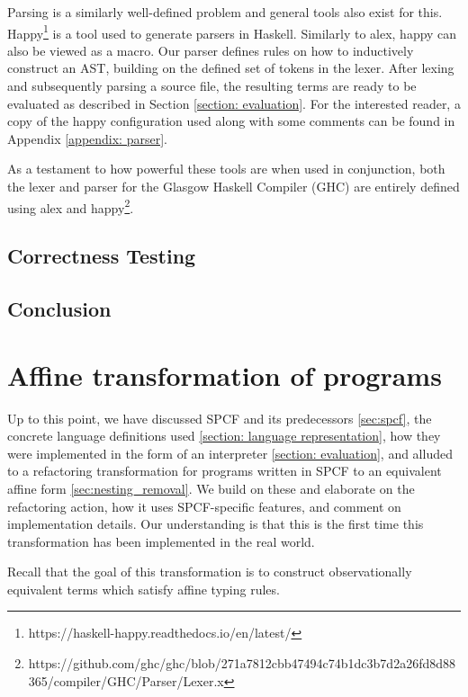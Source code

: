 \documentclass[12pt,a4paper]{report}
\theoremstyle{definition}
\theoremstyle{remark}
\begin{document}
Parsing is a similarly well-defined problem and general tools also exist for this. Happy\footnote{https://haskell-happy.readthedocs.io/en/latest/} is a tool used to generate parsers in Haskell. Similarly to alex, happy can also be viewed as a macro. Our parser defines rules on how to inductively construct an AST, building on the defined set of tokens in the lexer. After lexing and subsequently parsing a source file, the resulting terms are ready to be evaluated as described in Section \ref{section: evaluation}. For the interested reader, a copy of the happy configuration used along with some comments can be found in Appendix \ref{appendix: parser}.

As a testament to how powerful these tools are when used in conjunction, both the lexer and parser for the Glasgow Haskell Compiler (GHC) are entirely defined using alex and happy\footnote{https://github.com/ghc/ghc/blob/271a7812cbb47494c74b1dc3b7d2a26fd8d88365/compiler/GHC/Parser/Lexer.x}. 

\section{Correctness Testing}
\section{Conclusion}

\chapter{Affine transformation of programs}\label{chapter: denesting}
Up to this point, we have discussed SPCF and its predecessors \ref{sec:spcf}, the concrete language definitions used \ref{section: language representation}, how they were implemented in the form of an interpreter \ref{section: evaluation}, and alluded to a refactoring transformation for programs written in SPCF to an equivalent affine form \ref{sec:nesting_removal}. We build on these and elaborate on the refactoring action, how it uses SPCF-specific features, and comment on implementation details. Our understanding is that this is the first time this transformation has been implemented in the real world. 

Recall that the goal of this transformation is to construct observationally equivalent terms which satisfy affine typing rules. 
\end{document}
